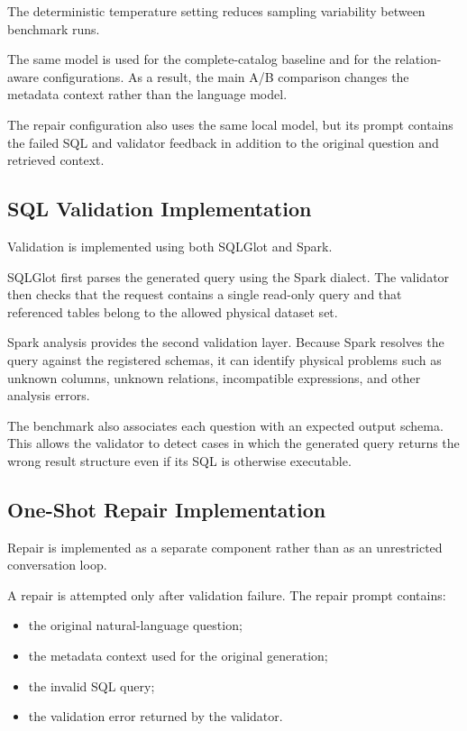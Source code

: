 The deterministic temperature setting reduces sampling variability between
benchmark runs.

The same model is used for the complete-catalog baseline and for the
relation-aware configurations. As a result, the main A/B comparison changes
the metadata context rather than the language model.

The repair configuration also uses the same local model, but its prompt
contains the failed SQL and validator feedback in addition to the original
question and retrieved context.


\subsection{SQL Validation Implementation}

Validation is implemented using both SQLGlot and Spark.

SQLGlot first parses the generated query using the Spark dialect. The
validator then checks that the request contains a single read-only query and
that referenced tables belong to the allowed physical dataset set.

Spark analysis provides the second validation layer. Because Spark resolves
the query against the registered schemas, it can identify physical problems
such as unknown columns, unknown relations, incompatible expressions, and
other analysis errors.

The benchmark also associates each question with an expected output schema.
This allows the validator to detect cases in which the generated query returns
the wrong result structure even if its SQL is otherwise executable.


\subsection{One-Shot Repair Implementation}

Repair is implemented as a separate component rather than as an unrestricted
conversation loop.

A repair is attempted only after validation failure. The repair prompt
contains:

\begin{itemize}

    \item the original natural-language question;

    \item the metadata context used for the original generation;

    \item the invalid SQL query;

    \item the validation error returned by the validator.

\end{itemize}

